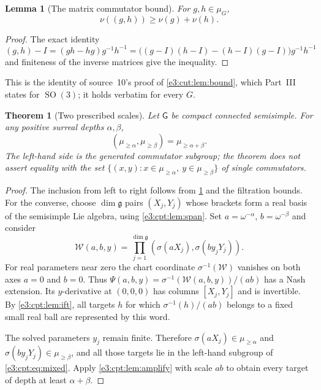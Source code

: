\documentclass[11pt,letterpaper]{article}
\numberwithin{equation}{section}
\newtheorem{theorem}{Theorem}[section]
\newtheorem{lemma}[lemma]{Lemma}
\theoremstyle{definition}
\theoremstyle{remark}
\newcommand{\SO}{\operatorname{SO}}
\newcommand{\comm}[2]{\left(#1,#2\right)}
\newcommand{\commset}[2]{\{\comm{x}{y}:x\in #1,\ y\in #2\}}
\newcommand{\sG}{\mathsf G}
\begin{document}
\begin{lemma}[The matrix commutator bound]\label{e3:cpt:lem:commbound}
For $g,h\in\mu_G$,
\[
 \nu(\comm gh)\ge\nu(g)+\nu(h).
\]
\end{lemma}
\begin{proof}
The exact identity
\[
 \comm gh-I=(gh-hg)g^{-1}h^{-1}
 =\bigl((g-I)(h-I)-(h-I)(g-I)\bigr)g^{-1}h^{-1}
\]
and finiteness of the inverse matrices give the inequality.
\end{proof}

This is the identity of source~10's proof of \cref{e3:cut:lem:bound}, which
Part~III states for $\SO(3)$; it holds verbatim for every $G$.

\begin{theorem}[Two prescribed scales]\label{e3:cpt:thm:mixed}
Let $\sG$ be compact connected semisimple. For any positive surreal depths
$\alpha,\beta$,
\begin{equation}\label{e3:cpt:eq:mixed}
 \comm{\mu_{\ge\alpha}}{\mu_{\ge\beta}}=\mu_{\ge\alpha+\beta}.
\end{equation}
The left-hand side is the generated commutator subgroup; the theorem does not
assert equality with the set $\commset{\mu_{\ge\alpha}}{\mu_{\ge\beta}}$ of
single commutators.
\end{theorem}
\begin{proof}
The inclusion from left to right follows from \cref{e3:cpt:lem:commbound} and
the filtration bounds. For the converse, choose $\dim\mathfrak g$ pairs
$(X_j,Y_j)$ whose brackets form a real basis of the semisimple Lie algebra,
using \cref{e3:cpt:lem:span}. Set $a=\omega^{-\alpha}$, $b=\omega^{-\beta}$ and
consider
\[
 \mathcal W(a,b,y)=\prod_{j=1}^{\dim\mathfrak g}
 \comm{\sigma(aX_j)}{\sigma(by_jY_j)}.
\]
For real parameters near zero the chart coordinate $\sigma^{-1}(\mathcal W)$
vanishes on both axes $a=0$ and $b=0$. Thus
$\Psi(a,b,y)=\sigma^{-1}(\mathcal W(a,b,y))/(ab)$ has a Nash extension. Its
$y$-derivative at $(0,0,0)$ has columns $[X_j,Y_j]$ and is invertible. By
\cref{e3:cpt:lem:ift}, all targets $h$ for which $\sigma^{-1}(h)/(ab)$ belongs
to a fixed small real ball are represented by this word.

The solved parameters $y_j$ remain finite. Therefore
$\sigma(aX_j)\in\mu_{\ge\alpha}$ and $\sigma(by_jY_j)\in\mu_{\ge\beta}$, and all
those targets lie in the left-hand subgroup of \cref{e3:cpt:eq:mixed}. Apply
\cref{e3:cpt:lem:amplify} with scale $ab$ to obtain every target of depth at
least $\alpha+\beta$.
\end{proof}
\end{document}
